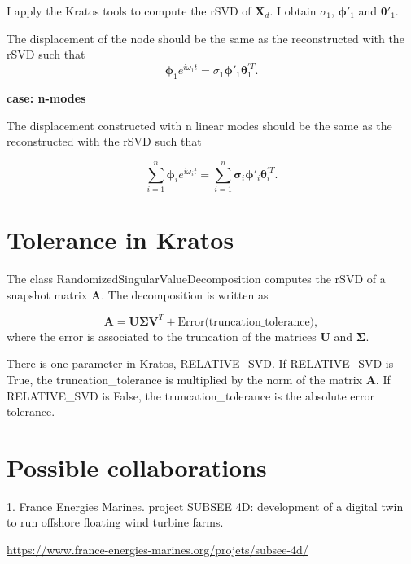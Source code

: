 \documentclass{article}
\begin{document}
I apply the Kratos tools to compute the rSVD of $\bm{X}_d$. I obtain $\sigma_1$, $\bm{\phi}'_1$ and $\bm{\theta}'_1$.\newline

The displacement of the node should be the same as the reconstructed with the rSVD such that
\begin{equation}
  \bm{\phi}_1 e^{i \omega_1 t} = \sigma_1 \bm{\phi}'_1 \bm{\theta}^{'T}_1. 
\end{equation}

\noindent \textbf{case: n-modes}

The displacement constructed with n linear modes should be the same as the reconstructed with the rSVD such that 

\begin{equation}
  \sum_{i=1}^n \bm{\phi}_i e^{i \omega_i t} = \sum_{i=1}^n \bm{\sigma}_i \bm{\phi}'_i \bm{\theta}^{'T}_i. 
\end{equation}


\newpage
\section{Tolerance in Kratos}
The class RandomizedSingularValueDecomposition computes the rSVD of a snapshot matrix $\bm{A}$. The decomposition is written as

\begin{equation}
  \bm{A} = \bm{U} \bm{\Sigma} \bm{V}^T + \text{Error(truncation\_tolerance)},
\end{equation}
where the error is associated to the truncation of the matrices $\bm{U}$ and $\bm{\Sigma}$.\newline

There is one parameter in Kratos, RELATIVE\_SVD. If RELATIVE\_SVD is True, the truncation\_tolerance is multiplied by the norm of the matrix $\bm{A}$. If RELATIVE\_SVD is False, the truncation\_tolerance is the absolute error tolerance. 

\section{Possible collaborations}

1. France Energies Marines. project SUBSEE 4D: development of a digital twin to run offshore floating wind turbine farms. \newline

\url{https://www.france-energies-marines.org/projets/subsee-4d/}\newline




\end{document}
